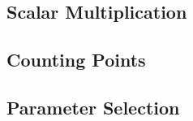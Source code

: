 

\subsection{Scalar Multiplication}
\subsection{Counting Points}
\subsection{Parameter Selection}


